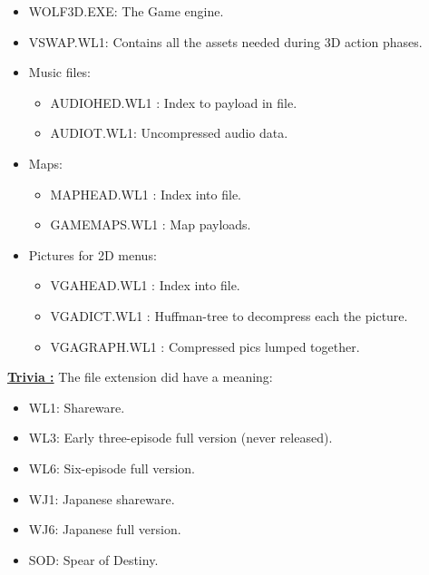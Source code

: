 \documentclass[book.tex]{subfiles}
\begin{document}
 \begin{itemize}
 \item WOLF3D.EXE: The Game engine.
 \item VSWAP.WL1: Contains all the assets needed during 3D action phases.
 \item Music files:
     \begin{itemize}
     \item AUDIOHED.WL1 : Index to payload in  file.
     \item AUDIOT.WL1: Uncompressed audio data. 
     \end{itemize}
\item Maps:
     \begin{itemize}
     \item MAPHEAD.WL1 : Index into  file.
      \item GAMEMAPS.WL1 : Map payloads.
      \end{itemize}
\item Pictures for 2D menus:
    \begin{itemize} 
    \item VGAHEAD.WL1 : Index into  file.
    \item VGADICT.WL1 : Huffman-tree to decompress each the picture.
    \item VGAGRAPH.WL1 : Compressed pics lumped together.
     \end{itemize}
\end{itemize}
 \par

\textbf{\underline{Trivia :}} The file extension did have a meaning: 
\begin{itemize}
\item WL1: Shareware.
\item WL3: Early three-episode full version (never released).
\item WL6: Six-episode full version.
\item WJ1: Japanese shareware.
\item WJ6: Japanese full version.
\item SOD: Spear of Destiny.
\end{itemize}
 
\end{document}
